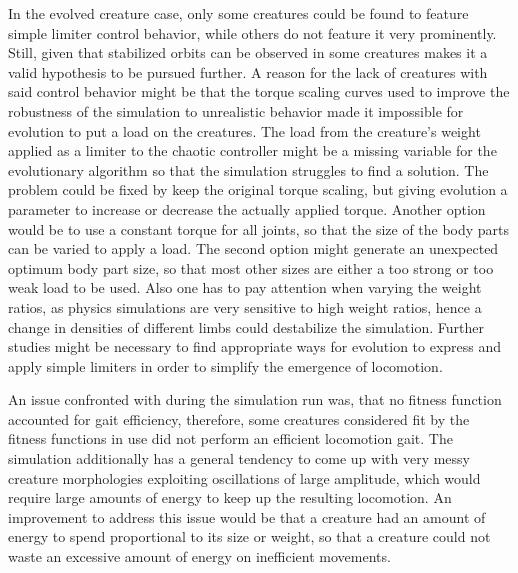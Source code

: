 \documentclass[main]{subfiles}
\begin{document}
In the evolved creature case, only some creatures could be found to feature simple limiter control behavior, while others do not feature it very prominently. %
%
Still, given that stabilized orbits can be observed in some creatures makes it a valid hypothesis to be pursued further.
%
A reason for the lack of creatures with said control behavior might be that the torque scaling curves used to improve the robustness of the simulation to unrealistic behavior made it impossible for evolution to put a load on the creatures. %
%
The load from the creature's weight applied as a limiter to the chaotic controller might be a missing variable for the evolutionary algorithm so that the simulation struggles to find a solution. %
%
The problem could be fixed by keep the original torque scaling, but giving evolution a parameter to increase or decrease the actually applied torque. %
%
Another option would be to use a constant torque for all joints, so that the size of the body parts can be varied to apply a load. %
%
The second option might generate an unexpected optimum body part size, so that most other sizes are either a too strong or too weak load to be used. %
%
Also one has to pay attention when varying the weight ratios, as physics simulations are very sensitive to high weight ratios, hence a change in densities of different limbs could destabilize the simulation. %
%
Further studies might be necessary to find appropriate ways for evolution to express and apply simple limiters in order to simplify the emergence of locomotion.%

An issue confronted with during the simulation run was, that no fitness function accounted for gait efficiency, therefore, some creatures considered fit by the fitness functions in use did not perform an efficient locomotion gait. %
%
The simulation additionally has a general tendency to come up with very messy creature morphologies exploiting oscillations of large amplitude, which would require large amounts of energy to keep up the resulting locomotion. %
%
An improvement to address this issue would be that a creature had an amount of energy to spend proportional to its size or weight, so that a creature could not waste an excessive amount of energy on inefficient movements. %
\end{document}
